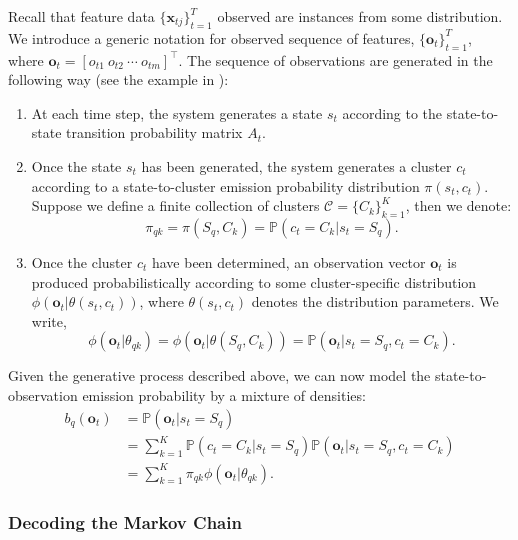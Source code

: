 Recall that feature data $\{ \mathbf{x}_{tj} \}_{t=1}^{T}$ observed are instances from some distribution. We introduce a generic notation for observed sequence of features, $\{ \mathbf{o}_{t} \}_{t=1}^{T}$, where $\mathbf{o}_t = [o_{t1} ~o_{t2} ~\cdots ~o_{tm}]^\top$. The sequence of observations are generated in the following way (see the example in ):
\begin{enumerate}
\item At each time step, the system generates a state $s_t$ according to the state-to-state transition probability matrix $A_t$.
\item Once the state $s_t$ has been generated, the system generates a cluster $c_t$ according to a state-to-cluster emission probability distribution $\pi(s_t,c_t)$. Suppose we define a finite collection of clusters $\mathcal{C} = \{ C_k \}_{k=1}^K$, then we denote:
\begin{equation}
\pi_{qk} = \pi(S_q, C_k) = \mathbb{P} \left( c_t = C_k | s_t = S_q \right).
\end{equation}
\item Once the cluster $c_t$ have been determined, an observation vector $\mathbf{o}_t$ is produced probabilistically according to some cluster-specific distribution $\phi(\mathbf{o}_t | \theta (s_t, c_t))$, where $\theta (s_t, c_t)$ denotes the distribution parameters. We write,
\begin{equation}
\phi(\mathbf{o}_t | \theta_{qk}) =  \phi(\mathbf{o}_t | \theta (S_q, C_k)) = \mathbb{P} \left( \mathbf{o}_t | s_t = S_q, c_t = C_k \right).
\end{equation}
\label{eq:phi}
\end{enumerate}
Given the generative process described above, we can now model the state-to-observation emission probability by a mixture of densities:
\begin{subequations}
\begin{align}
b_q (\mathbf{o}_t) & = \mathbb{P} \left( \mathbf{o}_t | s_t = S_q \right) \\
 & = \sum_{k=1}^K  \mathbb{P} \left( c_t = C_k | s_t = S_q \right) \mathbb{P} \left( \mathbf{o}_t | s_t = S_q, c_t = C_k \right) \\
 & = \sum_{k=1}^K \pi_{qk} \phi(\mathbf{o}_t | \theta_{qk}).
\end{align}
\label{eq:emission}
\end{subequations}

\subsubsection{Decoding the Markov Chain}

